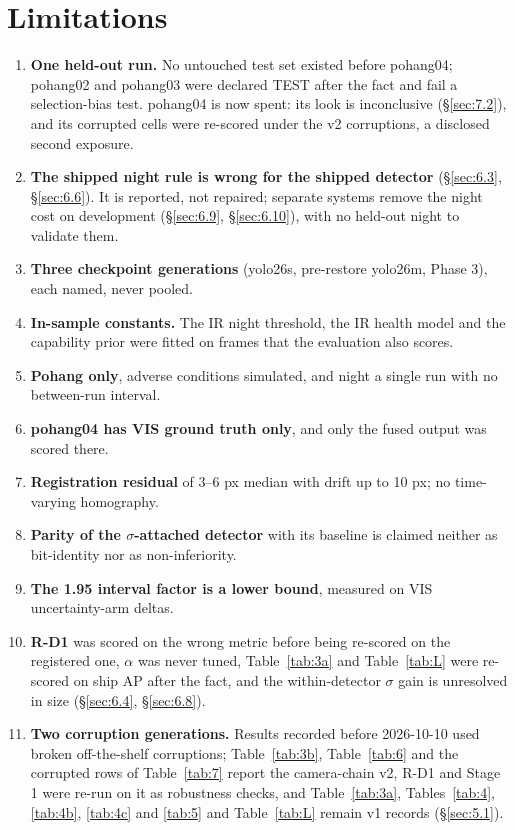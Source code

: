 \documentclass[10pt]{article}
\begin{document}
\section{Limitations}\label{sec:9}
\begin{enumerate}
\item \textbf{One held-out run.} No untouched test set existed before pohang04; pohang02 and pohang03 were declared TEST after the fact and fail a selection-bias test. pohang04 is now spent: its look is inconclusive (\S\ref{sec:7.2}), and its corrupted cells were re-scored under the v2 corruptions, a disclosed second exposure.
\item \textbf{The shipped night rule is wrong for the shipped detector} (\S\ref{sec:6.3}, \S\ref{sec:6.6}). It is reported, not repaired; separate systems remove the night cost on development (\S\ref{sec:6.9}, \S\ref{sec:6.10}), with no held-out night to validate them.
\item \textbf{Three checkpoint generations} (yolo26s, pre-restore yolo26m, Phase 3), each named, never pooled.
\item \textbf{In-sample constants.} The IR night threshold, the IR health model and the capability prior were fitted on frames that the evaluation also scores.
\item \textbf{Pohang only}, adverse conditions simulated, and night a single run with no between-run interval.
\item \textbf{pohang04 has VIS ground truth only}, and only the fused output was scored there.
\item \textbf{Registration residual} of 3--6 px median with drift up to 10 px; no time-varying homography.
\item \textbf{Parity of the $\sigma$-attached detector} with its baseline is claimed neither as bit-identity nor as non-inferiority.
\item \textbf{The 1.95 interval factor is a lower bound}, measured on VIS uncertainty-arm deltas.
\item \textbf{R-D1} was scored on the wrong metric before being re-scored on the registered one, $\alpha$ was never tuned, Table~\ref{tab:3a} and Table~\ref{tab:L} were re-scored on ship AP after the fact, and the within-detector $\sigma$ gain is unresolved in size (\S\ref{sec:6.4}, \S\ref{sec:6.8}).
\item \textbf{Two corruption generations.} Results recorded before 2026-10-10 used broken off-the-shelf corruptions; Table~\ref{tab:3b}, Table~\ref{tab:6} and the corrupted rows of Table~\ref{tab:7} report the camera-chain v2, R-D1 and Stage 1 were re-run on it as robustness checks, and Table~\ref{tab:3a}, Tables~\ref{tab:4}, \ref{tab:4b}, \ref{tab:4c} and \ref{tab:5} and Table~\ref{tab:L} remain v1 records (\S\ref{sec:5.1}).
\end{enumerate}
\end{document}
